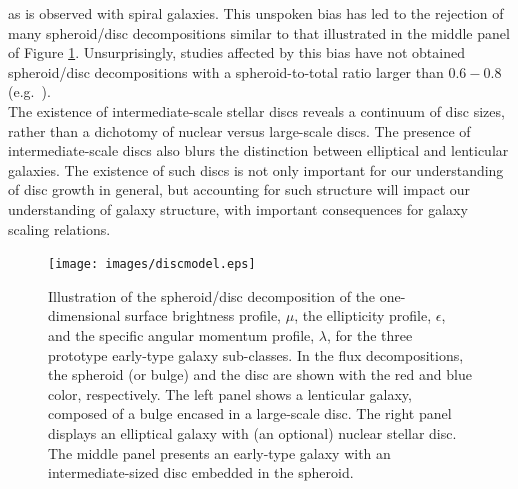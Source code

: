 \documentclass[useAMS,usenatbib,article]{mn2e}
\begin{document}
as is observed with spiral galaxies. 
This unspoken bias has led to the rejection of many spheroid/disc decompositions similar to that illustrated in the middle panel of Figure \ref{fig:model}. 
Unsurprisingly, studies affected by this bias have not obtained spheroid/disc decompositions with a spheroid-to-total ratio larger than $0.6 - 0.8$ 
(e.g.~\citealt{gadotti2008,head2014,querejeta2015,mendezabreu2015}). \\
The existence of intermediate-scale stellar discs reveals a continuum of disc sizes, 
rather than a dichotomy of nuclear versus large-scale discs. 
The presence of intermediate-scale discs also blurs the distinction between elliptical and lenticular galaxies.
The existence of such discs is not only important for our understanding of disc growth in general, 
but accounting for such structure will impact our understanding of galaxy structure, 
with important consequences for galaxy scaling relations. 

\begin{figure}
\begin{center}
\texttt{[image: images/discmodel.eps]}
\caption{Illustration of the spheroid/disc decomposition of the one-dimensional surface brightness profile, $\mu$, 
the ellipticity profile, $\epsilon$, and the specific angular momentum profile, $\lambda$,
for the three prototype early-type galaxy sub-classes. 
In the flux decompositions, the spheroid (or bulge) and the disc are shown with the red and blue color, respectively. 
The left panel shows a lenticular galaxy, composed of a bulge encased in a large-scale disc. 
The right panel displays an elliptical galaxy with (an optional) nuclear stellar disc. 
The middle panel presents an early-type galaxy with an intermediate-sized disc embedded in the spheroid. }
\label{fig:model}
\end{center}
\end{figure}
\end{document}
